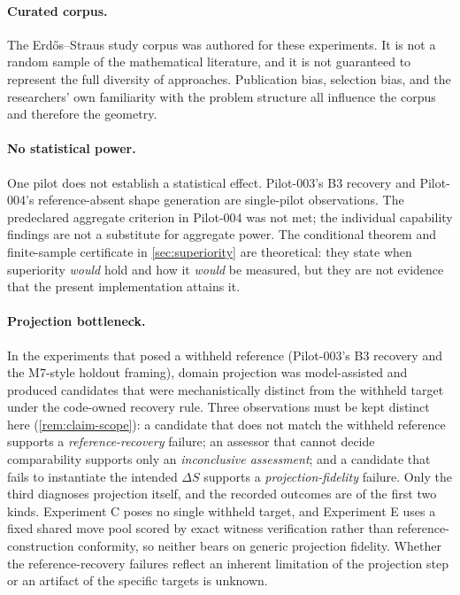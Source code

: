 \documentclass[11pt]{article}
\theoremstyle{gowthm}
\theoremstyle{gowplain}
\begin{document}
\paragraph{Curated corpus.}
The Erd\H{o}s--Straus study corpus was authored for these experiments. It is
not a random sample of the mathematical literature, and it is not guaranteed
to represent the full diversity of approaches. Publication bias, selection bias,
and the researchers' own familiarity with the problem structure all influence
the corpus and therefore the geometry.

\paragraph{No statistical power.}
One pilot does not establish a statistical effect. Pilot-003's B3 recovery
and Pilot-004's reference-absent shape generation are single-pilot observations.
The predeclared aggregate criterion in Pilot-004 was not met; the individual
capability findings are not a substitute for aggregate power. The conditional
theorem and finite-sample certificate in \cref{sec:superiority} are theoretical:
they state when superiority \emph{would} hold and how it \emph{would} be
measured, but they are not evidence that the present implementation attains it.

\paragraph{Projection bottleneck.}
In the experiments that posed a withheld reference (Pilot-003's B3 recovery
and the M7-style holdout framing), domain projection was model-assisted and
produced candidates that were mechanistically distinct from the withheld
target under the code-owned recovery rule. Three observations must be kept
distinct here (\cref{rem:claim-scope}): a candidate that does not match the
withheld reference supports a \emph{reference-recovery} failure; an assessor
that cannot decide comparability supports only an \emph{inconclusive
assessment}; and a candidate that fails to instantiate the intended
$\Delta S$ supports a \emph{projection-fidelity} failure. Only the third
diagnoses projection itself, and the recorded outcomes are of the first two
kinds. Experiment C poses no single withheld target, and Experiment E uses a
fixed shared move pool scored by exact witness verification rather than
reference-construction conformity, so neither bears on generic projection
fidelity. Whether the reference-recovery failures reflect an inherent
limitation of the projection step or an artifact of the specific targets is
unknown.
\end{document}
